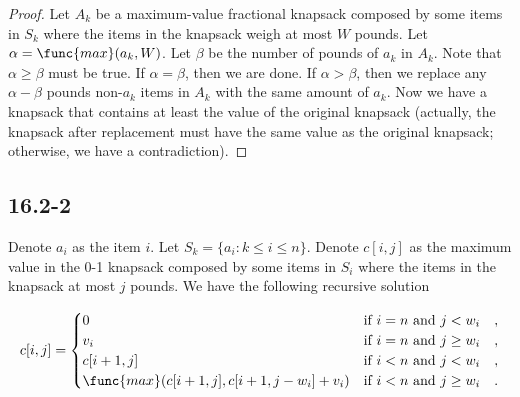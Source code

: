 \begin{proof}
    Let $A_k$ be a maximum-value fractional knapsack composed by some items in $S_k$
    where the items in the knapsack weigh at most $W$ pounds.
    Let $\alpha = \func{max}(a_k, W)$.
    Let $\beta$ be the number of pounds of $a_k$ in $A_k$.
    Note that $\alpha \geq \beta$ must be true.
    If $\alpha = \beta$, then we are done.
    If $\alpha > \beta$, then we replace any $\alpha - \beta$ pounds non-$a_k$ items in $A_k$
    with the same amount of $a_k$.
    Now we have a knapsack that contains at least the value of the original knapsack
    (actually, the knapsack after replacement must have the same value as the original knapsack;
    otherwise, we have a contradiction).
\end{proof}

\subsection*{16.2-2}

Denote $a_i$ as the item $i$.
Let $S_k = \{ a_i : k \leq i \leq n \}$.
Denote $c[i,j]$ as the maximum value in the 0-1 knapsack composed by some items in $S_i$
where the items in the knapsack at most $j$ pounds.
We have the following recursive solution

\begin{equation*}
    c[i,j] = 
    \begin{cases}
        0 & \text{if } i = n \text{ and } j < w_i \quad , \\
        v_i & \text{if } i = n \text{ and } j \geq w_i \quad , \\
        c[i+1,j] & \text{if } i < n \text{ and } j < w_i \quad , \\
        \func{max}(c[i+1,j], c[i+1,j-w_i] + v_i)
            & \text{if } i < n \text{ and } j \geq w_i \quad . \\
    \end{cases}
\end{equation*}

